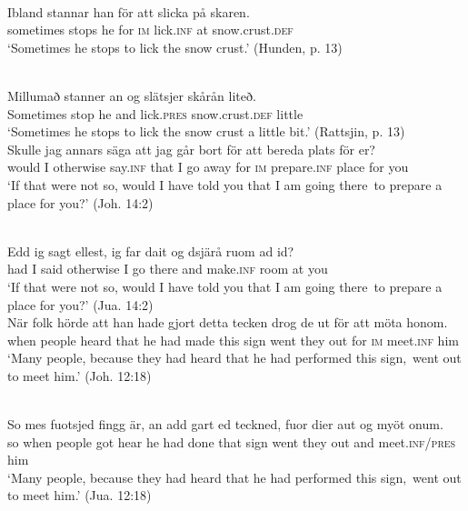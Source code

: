 \documentclass[output=paper]{langscibook}
\begin{document}
\ea
\label{ex:kalm:17}
\ea {}\label{ex:kalm:17a}\\
\gll Ibland stannar han för att slicka på skaren.\\
sometimes stops he for \textsc{im} lick.\textsc{inf} at snow.crust.\textsc{def}\\
\glt ‘Sometimes he stops to lick the snow crust.’ (Hunden, p. 13)

\ex {}\label{ex:kalm:17b}\\ 
\gll Millumað stanner an og slätsjer skårån liteð.\\
Sometimes stop he and lick.\textsc{pres} snow.crust.\textsc{def} little\\
\glt ‘Sometimes he stops to lick the snow crust a little bit.’ (Rattsjin, p. 13)
\z 
\ex
\label{ex:kalm:18}
\ea {}\label{ex:kalm:18a}\\
\gll Skulle jag annars säga att jag går bort för att bereda plats för er?\\
would I otherwise say.\textsc{inf} that I go away for \textsc{im} prepare.\textsc{inf} place for you\\
\glt ‘If that were not so, would I have told you that I am going there{~}to prepare a place for you?’ (Joh. 14:2)

\ex {}\label{ex:kalm:18b}\\
\gll Edd ig sagt ellest, ig far dait og dsjärå ruom ad id?\\
had I said otherwise I go there and make.\textsc{inf} room at you\\
 \glt ‘If that were not so, would I have told you that I am going there{~}to prepare a place for you?’ (Jua. 14:2)
\z 
\ex
\label{ex:kalm:19}
\ea {}\label{ex:kalm:19a}\\
\gll När folk hörde att han hade gjort detta tecken drog de ut för att möta honom.\\
when people heard that he had made this sign went they out for \textsc{im} meet.\textsc{inf} him\\
\glt ‘Many people, because they had heard that he had performed this sign,{~}went out to meet him.’ (Joh. 12:18)

\ex {}\label{ex:kalm:19b}\\
\gll So mes fuotsjed fingg är, an add gart ed teckned, fuor dier aut og myöt onum.\\
so when people got hear he had done that sign went they out and meet.\textsc{inf/pres} him\\
\glt ‘Many people, because they had heard that he had performed this sign,{~}went out to meet him.’ (Jua. 12:18)
\z 
\z 
\end{document}
